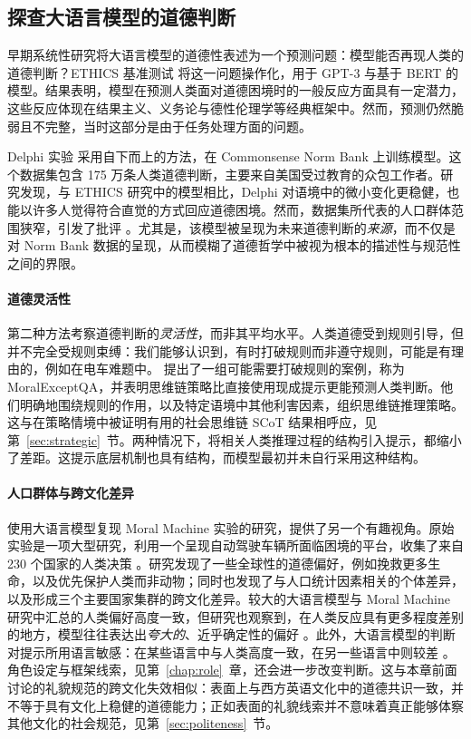 \subsection{探查大语言模型的道德判断}
早期系统性研究将大语言模型的道德性表述为一个预测问题：模型能否再现人类的道德判断？ETHICS 基准测试 \citep{hendrycks2020aligning} 将这一问题操作化，用于 GPT-3 与基于 BERT 的模型。结果表明，模型在预测人类面对道德困境时的一般反应方面具有一定潜力，这些反应体现在结果主义、义务论与德性伦理学等经典框架中。然而，预测仍然脆弱且不完整，当时这部分是由于任务处理方面的问题。

Delphi 实验 \citep{jiang2025delphi} 采用自下而上的方法，在 Commonsense Norm Bank 上训练模型。这个数据集包含 175 万条人类道德判断，主要来自美国受过教育的众包工作者。研究发现，与 ETHICS 研究中的模型相比，Delphi 对语境中的微小变化更稳健，也能以许多人觉得符合直觉的方式回应道德困境。然而，数据集所代表的人口群体范围狭窄，引发了批评 \citep{rystrom2023apolitical}。尤其是，该模型被呈现为未来道德判断的\emph{来源}，而不仅是对 Norm Bank 数据的呈现，从而模糊了道德哲学中被视为根本的描述性与规范性之间的界限。

\paragraph{道德灵活性}
第二种方法考察道德判断的\emph{灵活性}，而非其平均水平。人类道德受到规则引导，但并不完全受规则束缚：我们能够认识到，有时打破规则而非遵守规则，可能是有理由的，例如在电车难题中。\citet{jin2022make} 提出了一组可能需要打破规则的案例，称为 MoralExceptQA，并表明思维链策略比直接使用现成提示更能预测人类判断。他们明确地围绕规则的作用，以及特定语境中其他利害因素，组织思维链推理策略。这与在策略情境中被证明有用的社会思维链 SCoT 结果相呼应，见第~\ref{sec:strategic}~节。两种情况下，将相关人类推理过程的结构引入提示，都缩小了差距。这提示底层机制也具有结构，而模型最初并未自行采用这种结构。

\paragraph{人口群体与跨文化差异}
使用大语言模型复现 Moral Machine 实验的研究，提供了另一个有趣视角。原始实验是一项大型研究，利用一个呈现自动驾驶车辆所面临困境的平台，收集了来自 230 个国家的人类决策 \citep{awad2018moral}。研究发现了一些全球性的道德偏好，例如挽救更多生命，以及优先保护人类而非动物；同时也发现了与人口统计因素相关的个体差异，以及形成三个主要国家集群的跨文化差异。较大的大语言模型与 Moral Machine 研究中汇总的人类偏好高度一致，但研究也观察到，在人类反应具有更多程度差别的地方，模型往往表达出\emph{夸大的}、近乎确定性的偏好 \citep{takemoto2024moral}。此外，大语言模型的判断对提示所用语言敏感：在某些语言中与人类高度一致，在另一些语言中则较差 \citep{jin2025multilingual}。角色设定与框架线索，见第~\ref{chap:role}~章，还会进一步改变判断。这与本章前面讨论的礼貌规范的跨文化失效相似：表面上与西方英语文化中的道德共识一致，并不等于具有文化上稳健的道德能力；正如表面的礼貌线索并不意味着真正能够体察其他文化的社会规范，见第~\ref{sec:politeness}~节。

